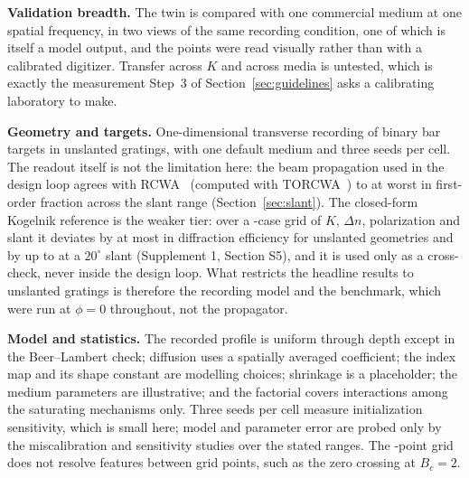 \documentclass{optica-article}
\begin{document}
\textbf{Validation breadth.} The twin is compared with one commercial medium at
one spatial frequency, in two views of the same recording condition, one of
which is itself a model output, and the points were read visually rather than
with a calibrated digitizer. Transfer across $K$ and across media is untested,
which is exactly the measurement Step~3 of Section~\ref{sec:guidelines} asks a
calibrating laboratory to make.

\textbf{Geometry and targets.} One-dimensional transverse recording of binary
bar targets in unslanted gratings, with one default medium and three seeds per
cell. The readout itself is not the limitation here: the beam propagation used
in the design loop agrees with RCWA~\cite{moharam1981rigorous} (computed with
TORCWA~\cite{kim2023torcwa}) to at worst \BPMRCWAMaxDev{} in first-order
fraction across the slant range (Section~\ref{sec:slant}). The closed-form
Kogelnik reference is the weaker tier: over a \RCWAVGridNCases-case grid of
$K$, $\Delta n$, polarization and slant it deviates by at most
\RCWAUnslantedMaxDev{} in diffraction efficiency for unslanted geometries and
by up to \RCWAVGridMaxDev{} at a $20^\circ$ slant (Supplement 1, Section S5),
and it is used only as a cross-check, never inside the design loop. What
restricts the headline results to unslanted gratings is therefore the
recording model and the benchmark, which were run at $\phi=0$ throughout, not
the propagator.

\textbf{Model and statistics.} The recorded profile is uniform through depth
except in the Beer--Lambert check; diffusion uses a spatially averaged
coefficient; the index map and its shape constant are modelling choices;
shrinkage is a placeholder; the medium parameters are illustrative; and the
factorial covers interactions among the saturating mechanisms only. Three
seeds per cell measure initialization sensitivity, which is small here; model
and parameter error are probed only by the miscalibration and sensitivity
studies over the stated ranges. The \MOneNK-point grid does not resolve
features between grid points, such as the zero crossing at $B_c=2$.
\end{document}
